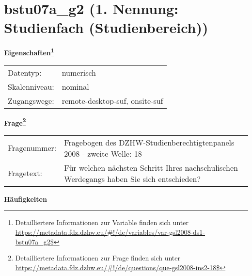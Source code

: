 
    \setcounter{footnote}{0}

    \vspace*{-1.8cm}
	\section{bstu07a\_g2 (1. Nennung: Studienfach (Studienbereich))}
	\label{section:bstu07a_g2}



    \vspace*{0.5cm}
    \noindent\textbf{Eigenschaften\footnote{Detailliertere Informationen zur Variable finden sich unter
		\url{https://metadata.fdz.dzhw.eu/\#!/de/variables/var-gsl2008-ds1-bstu07a_g2$}}}\\
	\begin{tabularx}{\hsize}{@{}lX}
	Datentyp: & numerisch \\
	Skalenniveau: & nominal \\
	Zugangswege: &
	  remote-desktop-suf, 
	  onsite-suf
 \\
    \end{tabularx}



				\vspace*{0.5cm}
                \noindent\textbf{Frage\footnote{Detailliertere Informationen zur Frage finden sich unter
		              \url{https://metadata.fdz.dzhw.eu/\#!/de/questions/que-gsl2008-ins2-18$}}}\\
				\begin{tabularx}{\hsize}{@{}lX}
					Fragenummer: &
					  Fragebogen des DZHW-Studienberechtigtenpanels 2008 - zweite Welle:
					  18
 \\
					Fragetext: & Für welchen nächsten Schritt Ihres nachschulischen Werdegangs haben Sie sich entschieden? \\
				\end{tabularx}





        		\vspace*{0.5cm}
                \noindent\textbf{Häufigkeiten}


